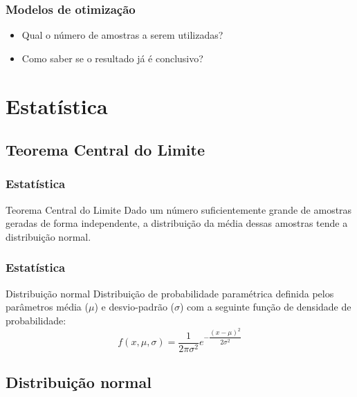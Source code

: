 \documentclass[xcolor=dvipsnames]{beamer}
\begin{document}
\begin{frame}%
\frametitle{Modelos de otimização}

\begin{itemize}
\item Qual o número de amostras a serem utilizadas?
\item Como saber se o resultado já é conclusivo?
\end{itemize}

\end{frame}%


\section{Estatística}

\subsection{Teorema Central do Limite}

\begin{frame}%
\frametitle{Estatística}

\begin{block}{Teorema Central do Limite}
Dado um número suficientemente grande de amostras geradas de forma independente, a distribuição da média dessas amostras tende a distribuição normal.
\end{block}

\end{frame}%

\begin{frame}%
\frametitle{Estatística}

\begin{block}{Distribuição normal}
Distribuição de probabilidade paramétrica definida pelos parâmetros média ($\mu$) e desvio-padrão ($\sigma$) com a seguinte função de densidade de probabilidade:
\[
f(x, \mu, \sigma) = \dfrac{1}{2\pi\sigma^{2}}e^{-\dfrac{(x - \mu)^2}{2\sigma^2}}
\]
\end{block}

\end{frame}%

\subsection{Distribuição normal}
\end{document}

